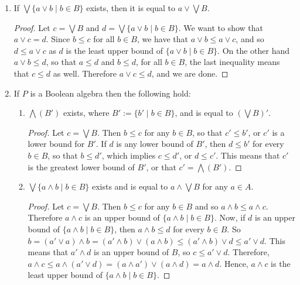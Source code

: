 \documentclass[12pt]{article}
\begin{document}
\begin{enumerate}
\begin{proof}
Conversely, suppose $D:=\bigvee \lbrace b_i\mid i\in I\rbrace$ exists and is equal to $d$.  Then for any $b\in B$, $b\in B_i$ for some $i\in I$, so that $b\le b_i$, and hence $b\le d$.  This shows that $d$ is an upper bound of $B$.  If $f$ is any upper bound of $B$, then $f$ is an upper bound of $B_i$ in particular, so $b_i\le f$.  Since $i$ is arbitray, $d\le f$, or that $d$ is the least upper bound of $B$.
\end{proof}
\item If $\bigvee \lbrace a\vee b\mid b\in B\rbrace$ exists, then it is equal to $a\vee \bigvee B$.
\begin{proof}  Let $c=\bigvee B$ and $d=\bigvee \lbrace a\vee b\mid b\in B\rbrace$.  We want to show that $a\vee c=d$.  Since $b\le c$ for all $b\in B$, we have that $a\vee b\le a\vee c$, and so $d\le a\vee c$ as $d$ is the least upper bound of $\lbrace a\vee b\mid b\in B\rbrace$.  On the other hand $a\vee b\le d$, so that $a\le d$ and $b\le d$, for all $b\in B$, the last inequality means that $c\le d$ as well.  Therefore $a\vee c\le d$, and we are done.
\end{proof}
\item If $P$ is a Boolean algebra then the following hold:
\begin{enumerate}
\item $\bigwedge (B')$ exists, where $B':=\lbrace b'\mid b\in B\rbrace$, and is equal to $(\bigvee B)'$.
\begin{proof}  Let $c=\bigvee B$.  Then $b\le c$ for any $b\in B$, so that $c'\le b'$, or $c'$ is a lower bound for $B'$.  If $d$ is any lower bound of $B'$, then $d\le b'$ for every $b\in B$, so that $b\le d'$, which implies $c\le d'$, or $d\le c'$.  This means that $c'$ is the greatest lower bound of $B'$, or that $c'=\bigwedge (B')$.
\end{proof}
\item
$\bigvee \lbrace a\wedge b\mid b\in B\rbrace$ exists and is equal to $a\wedge \bigvee B$ for any $a\in A$.
\begin{proof}
Let $c=\bigvee B$.  Then $b\le c$ for any $b\in B$ and so $a\wedge b\le a\wedge c$.  Therefore $a\wedge c$ is an upper bound of $\lbrace a\wedge b\mid b\in B\rbrace$.  Now, if $d$ is an upper bound of $\lbrace a\wedge b\mid b\in B\rbrace$, then $a\wedge b\le d$ for every $b\in B$.  So $b=(a'\vee a)\wedge b=(a'\wedge b)\vee (a\wedge b) \le (a'\wedge b)\vee d \le a'\vee d$.  This means that $a'\wedge d$ is an upper bound of $B$, so $c\le a'\vee d$.  Therefore, $a\wedge c \le a \wedge (a'\vee d) = (a\wedge a')\vee (a\wedge d)=a\wedge d$.  Hence, $a\wedge c$ is the least upper bound of $\lbrace a\wedge b\mid b\in B\rbrace$.

\end{proof}
\end{enumerate}
\end{enumerate}
\end{document}
